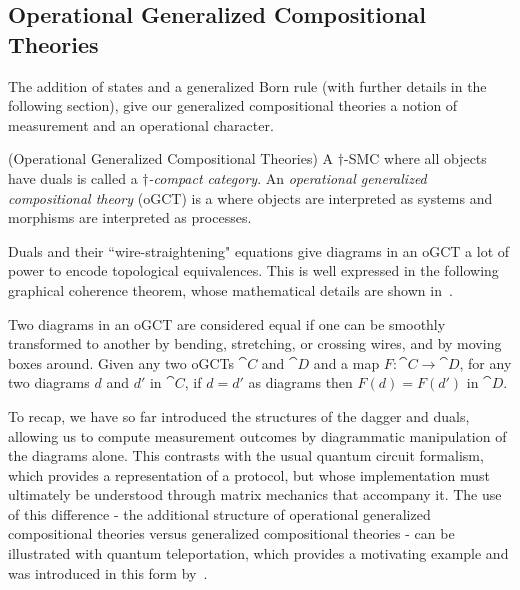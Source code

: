 \subsection{Operational Generalized Compositional Theories}

The addition of states and a generalized Born rule (with further details in the following section), give our generalized compositional theories a notion of measurement and an operational character.

\begin{defn}(Operational Generalized Compositional Theories)
\label{thm:ogct}
A $\dagger$-SMC where all objects have duals is called a \emph{$\dagger$-compact category}. An \emph{operational generalized compositional theory} (oGCT) is a \dcc where objects are interpreted as systems and morphisms are interpreted as processes.
\end{defn}

Duals and their ``wire-straightening" equations give diagrams in an oGCT a lot of power to encode topological equivalences.  This is well expressed in the following graphical coherence theorem, whose mathematical details are shown in~\cite{selinger2011survey}.

\begin{theorem}
\label{thm:fund}
Two diagrams in an oGCT are considered equal if one can be smoothly transformed to another by bending, stretching, or crossing wires, and by moving boxes around. Given any two oGCTs $\cat{C}$ and $\cat{D}$ and a map $F:\cat{C}\to\cat{D}$, for any two diagrams $d$ and $d'$ in $\cat{C}$, if $d=d'$ as diagrams then $F(d)=F(d')$ in $\cat{D}$.
\end{theorem}

To recap, we have so far introduced the structures of the dagger and duals, allowing us to compute measurement outcomes by diagrammatic manipulation of the diagrams alone.  This contrasts with the usual quantum circuit formalism, which provides a representation of a protocol, but whose implementation must ultimately be understood through matrix mechanics that accompany it. The use of this difference - the  additional structure of operational generalized compositional theories versus generalized compositional theories - can be illustrated with quantum teleportation, which provides a motivating example and was introduced in this form by~\cite{abramsky2004categorical}.

